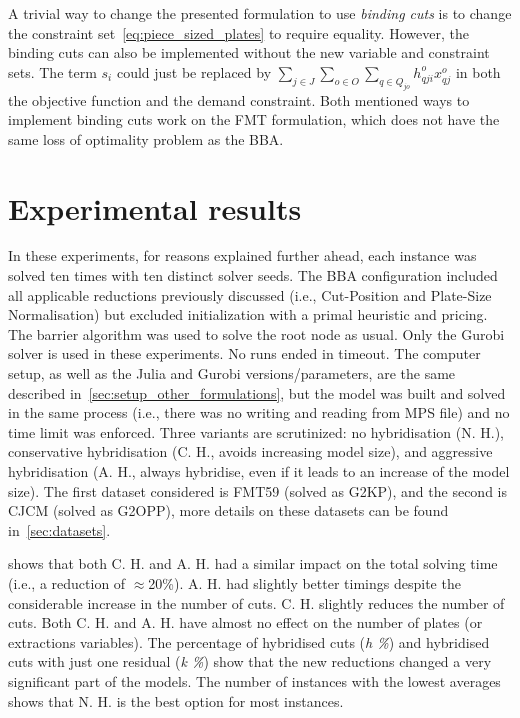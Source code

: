 \documentclass[ppgc,tese,english,formais,babel]{iiufrgs}
\begin{document}
A trivial way to change the presented formulation to use \emph{binding cuts} is to change the constraint set~\eqref{eq:piece_sized_plates} to require equality.
However, the binding cuts can also be implemented without the new variable and constraint sets.
The term \(s_i\) could just be replaced by \(\sum_{j \in J}\sum_{o \in O}\sum_{q \in Q_{jo}} h^o_{qji} x^o_{qj}\) in both the objective function and the demand constraint.
Both mentioned ways to implement binding cuts work on the FMT formulation, which does not have the same loss of optimality problem as the BBA.


\section{Experimental results}

In these experiments, for reasons explained further ahead, each instance was solved ten times with ten distinct solver seeds.
The BBA configuration included all applicable reductions previously discussed (i.e., Cut-Position and Plate-Size Normalisation) but excluded initialization with a primal heuristic and pricing.
The barrier algorithm was used to solve the root node as usual.
Only the Gurobi solver is used in these experiments.
No runs ended in timeout.
The computer setup, as well as the Julia and Gurobi versions/parameters, are the same described in~\cref{sec:setup_other_formulations}, but the model was built and solved in the same process (i.e., there was no writing and reading from MPS file) and no time limit was enforced.
Three variants are scrutinized: no hybridisation (N. H.), conservative hybridisation (C. H., avoids increasing model size), and aggressive hybridisation (A. H., always hybridise, even if it leads to an increase of the model size).
The first dataset considered is FMT59 (solved as G2KP), and the second is CJCM (solved as G2OPP), more details on these datasets can be found in~\cref{sec:datasets}.

 shows that both C. H. and A. H. had a similar impact on the total solving time (i.e., a reduction of \(\approx\)20\%).
A. H. had slightly better timings despite the considerable increase in the number of cuts.
C. H. slightly reduces the number of cuts.
Both C. H. and A. H. have almost no effect on the number of plates (or extractions variables).
The percentage of hybridised cuts (\emph{h \%}) and hybridised cuts with just one residual (\emph{k \%}) show that the new reductions changed a very significant part of the models.
The number of instances with the lowest averages shows that N. H. is the best option for most instances.
\end{document}
